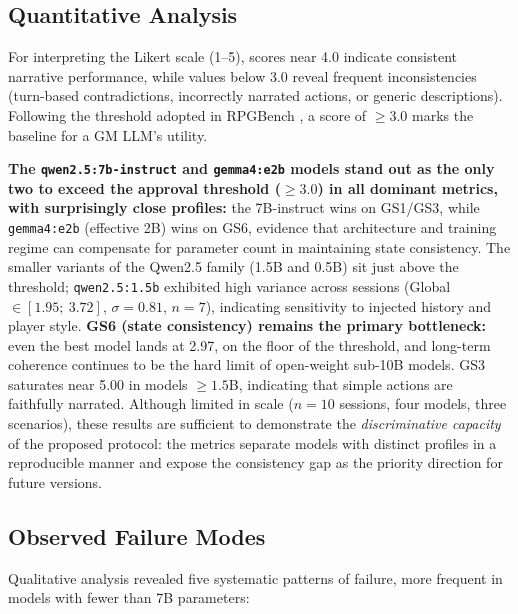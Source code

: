 \documentclass[12pt]{article}
\begin{document}
\subsection{Quantitative Analysis}

For interpreting the Likert scale (1--5), scores near 4.0 indicate consistent narrative performance, while values below 3.0 reveal frequent inconsistencies (turn-based contradictions, incorrectly narrated actions, or generic descriptions). Following the threshold adopted in RPGBench \cite{yu:2025}, a score of $\geq 3.0$ marks the baseline for a GM LLM's utility.

\textbf{The \texttt{qwen2.5:7b-instruct} and \texttt{gemma4:e2b} models stand out as the only two to exceed the approval threshold ($\geq 3.0$) in all dominant metrics, with surprisingly close profiles:} the 7B-instruct wins on GS1/GS3, while \texttt{gemma4:e2b} (effective 2B) wins on GS6, evidence that architecture and training regime can compensate for parameter count in maintaining state consistency. The smaller variants of the Qwen2.5 family (1.5B and 0.5B) sit just above the threshold; \texttt{qwen2.5:1.5b} exhibited high variance across sessions (Global $\in [1.95;~3.72]$, $\sigma=0.81$, $n=7$), indicating sensitivity to injected history and player style. \textbf{GS6 (state consistency) remains the primary bottleneck:} even the best model lands at 2.97, on the floor of the threshold, and long-term coherence continues to be the hard limit of open-weight sub-10B models. GS3 saturates near 5.00 in models $\geq 1.5$B, indicating that simple actions are faithfully narrated. Although limited in scale ($n=10$ sessions, four models, three scenarios), these results are sufficient to demonstrate the \textit{discriminative capacity} of the proposed protocol: the metrics separate models with distinct profiles in a reproducible manner and expose the consistency gap as the priority direction for future versions.

\subsection{Observed Failure Modes}

Qualitative analysis revealed five systematic patterns of failure, more frequent in models with fewer than 7B parameters:
\end{document}
